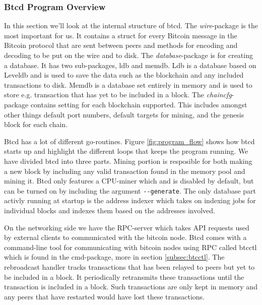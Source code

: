 \documentclass[12pt]{article}
\begin{document}
\subsubsection{Btcd Program Overview}
In this section we'll look at the internal structure of btcd. The \emph{wire}-package is the most important for us. It contains a struct for every Bitcoin message in the Bitcoin protocol that are sent between peers and methods for encoding and decoding to be put on the wire and to disk. The \emph{database}-package is for creating a database. It has two sub-packages, ldb and memdb. Ldb is a database based on Leveldb and is used to save the data such as the blockchain and any included transactions to disk. Memdb is a database set entirely in memory and is used to store e.g. transaction that has yet to be included in a block. The \emph{chaincfg}-package contains setting for each blockchain supported. This includes amongst other things default port numbers, default targets for mining, and the genesis block for each chain.


Btcd has a lot of different go-routines. Figure \ref{fig:program_flow} shows how btcd starts up and highlight the different loops that keeps the program running. We have divided btcd into three parts. Mining portion is resposible for both making a new block by including any valid transaction found in the memory pool and mining it. Btcd only features a CPU-miner which and is disabled by default, but can be turned on by including the argument \texttt{-{}-generate}. The only database part activly running at startup is the address indexer which takes on indexing jobs for individual blocks and indexes them based on the addresses involved.

On the networking side we have the RPC-server which takes API requests used by external clients to communicated with the bitcoin node. Btcd comes with a command-line tool for communicating with bitcoin nodes using RPC called btcctl which is found in the cmd-package, more in section \ref{subsec:btcctl}. The rebroadcast handler tracks transactions that has been relayed to peers but yet to be included in a block. It periodically retransmits these transactions until the transaction is included in a block. Such transactions are only kept in memory and any peers that have restarted would have lost these transactions.
\end{document}
